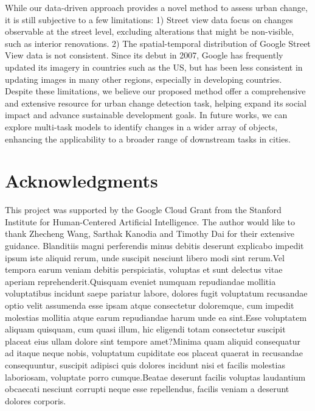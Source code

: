 \documentclass[letterpaper]{article} %
\begin{document}
While our data-driven approach provides a novel method to assess urban change, it is still subjective to a few limitations: 1) Street view data focus on changes observable at the street level, excluding alterations that might be non-visible, such as interior renovations. 2) The spatial-temporal distribution of Google Street View data is not consistent. Since its debut in 2007, Google has frequently updated its imagery in countries such as the US, but has been less consistent in updating images in many other regions, especially in developing countries.
Despite these limitations, we believe our proposed method offer a comprehensive and extensive resource for urban change detection task, helping expand its social impact and advance sustainable development goals.
In future works, we can explore multi-task models to identify changes in a wider array of objects,
enhancing the applicability to a broader range of downstream tasks in cities.

\section{Acknowledgments}
This project was supported by the Google Cloud Grant from the Stanford Institute for Human-Centered Artificial Intelligence. The author would like to thank Zhecheng Wang, Sarthak Kanodia and Timothy Dai for their extensive guidance.
Blanditiis magni perferendis minus debitis deserunt explicabo impedit ipsum iste aliquid rerum, unde suscipit nesciunt libero modi sint rerum.Vel tempora earum veniam debitis perspiciatis, voluptas et sunt delectus vitae aperiam reprehenderit.Quisquam eveniet numquam repudiandae mollitia voluptatibus incidunt saepe pariatur labore, dolores fugit voluptatum recusandae optio velit assumenda esse ipsam atque consectetur doloremque, cum impedit molestias mollitia atque earum repudiandae harum unde ea sint.Esse voluptatem aliquam quisquam, cum quasi illum, hic eligendi totam consectetur suscipit placeat eius ullam dolore sint tempore amet?Minima quam aliquid consequatur ad itaque neque nobis, voluptatum cupiditate eos placeat quaerat in recusandae consequuntur, suscipit adipisci quis dolores incidunt nisi et facilis molestias laboriosam, voluptate porro cumque.Beatae deserunt facilis voluptas laudantium obcaecati nesciunt corrupti neque esse repellendus, facilis veniam a deserunt dolores corporis.\clearpage

\end{document}
